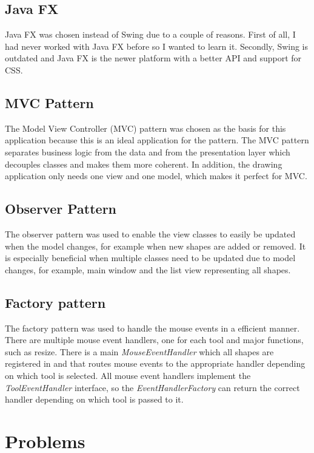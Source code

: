 \documentclass[11pt, a4paper]{article}
\begin{document}
\subsection{Java FX}

Java FX was chosen instead of Swing due to a couple of reasons. First of all, I had never worked with Java FX before so I wanted to learn it. Secondly, Swing is outdated and Java FX is the newer platform with a better API and support for CSS.

\subsection{MVC Pattern}

The Model View Controller (MVC) pattern was chosen as the basis for this application because this is an ideal application for the pattern. The MVC pattern separates business logic from the data and from the presentation layer which decouples classes and makes them more coherent. In addition, the drawing application only needs one view and one model, which makes it perfect for MVC. 

\subsection{Observer Pattern}

The observer pattern was used to enable the view classes to easily be updated when the model changes, for example when new shapes are added or removed. It is especially beneficial when multiple classes need to be updated due to model changes, for example, main window and the list view representing all shapes.

\subsection{Factory pattern}

The factory pattern was used to handle the mouse events in a efficient manner. There are multiple mouse event handlers, one for each tool and major functions, such as resize. There is a main \emph{MouseEventHandler} which all shapes are registered in and that routes mouse events to the appropriate handler depending on which tool is selected. All mouse event handlers implement the \emph{ToolEventHandler} interface, so the \emph{EventHandlerFactory} can return the correct handler depending on which tool is passed to it. 

\section{Problems}
\end{document}
